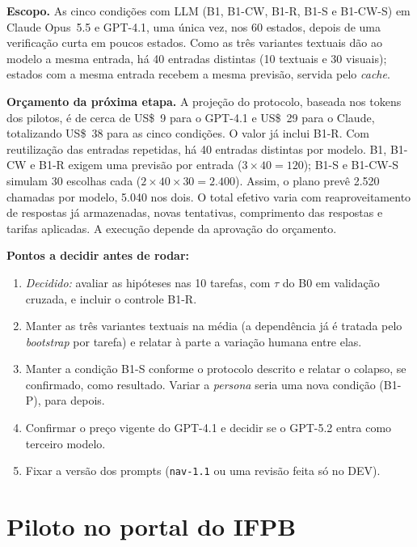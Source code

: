 \documentclass[12pt]{article}
\newcommand{\code}[1]{\texttt{#1}}
\begin{document}
\begin{planejado}
\textbf{Escopo.} As cinco condições com LLM (B1, B1-CW, B1-R, B1-S e B1-CW-S) em Claude Opus~5.5 e GPT-4.1, uma única vez, nos 60 estados, depois de uma verificação curta em poucos estados. Como as três variantes textuais dão ao modelo a mesma entrada, há 40 entradas distintas (10 textuais e 30 visuais); estados com a mesma entrada recebem a mesma previsão, servida pelo \textit{cache}.

\textbf{Orçamento da próxima etapa.} A projeção do protocolo, baseada nos tokens dos pilotos, é de cerca de US\$~9 para o GPT-4.1 e US\$~29 para o Claude, totalizando US\$~38 para as cinco condições. O valor já inclui B1-R. Com reutilização das entradas repetidas, há 40 entradas distintas por modelo. B1, B1-CW e B1-R exigem uma previsão por entrada ($3\times40=120$); B1-S e B1-CW-S simulam 30 escolhas cada ($2\times40\times30=2.400$). Assim, o plano prevê 2.520 chamadas por modelo, 5.040 nos dois. O total efetivo varia com reaproveitamento de respostas já armazenadas, novas tentativas, comprimento das respostas e tarifas aplicadas. A execução depende da aprovação do orçamento.

\textbf{Pontos a decidir antes de rodar:}
\begin{enumerate}[leftmargin=*,itemsep=0pt]
\item \textit{Decidido:} avaliar as hipóteses nas 10 tarefas, com $\tau$ do B0 em validação cruzada, e incluir o controle B1-R.
\item Manter as três variantes textuais na média (a dependência já é tratada pelo \textit{bootstrap} por tarefa) e relatar à parte a variação humana entre elas.
\item Manter a condição B1-S conforme o protocolo descrito e relatar o colapso, se confirmado, como resultado. Variar a \textit{persona} seria uma nova condição (B1-P), para depois.
\item Confirmar o preço vigente do GPT-4.1 e decidir se o GPT-5.2 entra como terceiro modelo.
\item Fixar a versão dos prompts (\code{nav-1.1} ou uma revisão feita só no DEV).
\end{enumerate}
\end{planejado}

\section{Piloto no portal do IFPB}
\label{sec:ifpb}
\end{document}
